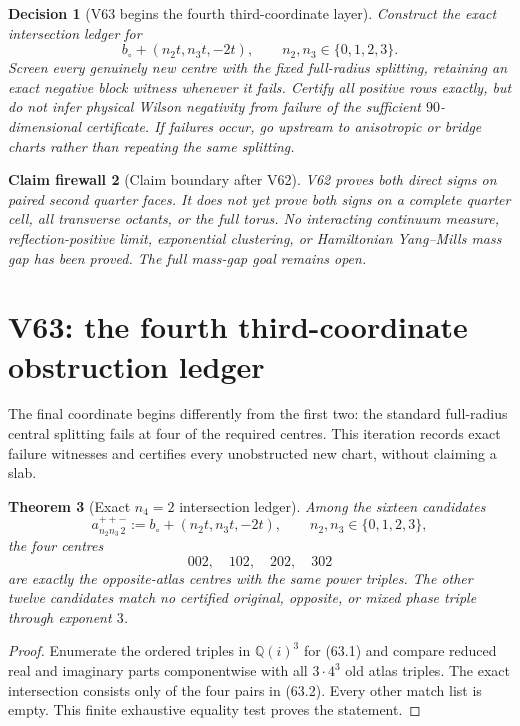 \documentclass[11pt,oneside]{article}
\newtheorem{theorem}{Theorem}[section]
\newtheorem{firewall}[theorem]{Claim firewall}
\newtheorem{decision}[theorem]{Decision}
\theoremstyle{definition}
\theoremstyle{remark}
\begin{document}
\begin{decision}[V63 begins the fourth third-coordinate layer]
\label{dec:newv62-next}
Construct the exact intersection ledger for
\[
 b_\circ+(n_2t,n_3t,-2t),\qquad n_2,n_3\in\{0,1,2,3\}. \tag{62.14}
\]
Screen every genuinely new centre with the fixed full-radius
splitting, retaining an exact negative block witness whenever it
fails.  Certify all positive rows exactly, but do not infer physical
Wilson negativity from failure of the sufficient \(90\)-dimensional
certificate.  If failures occur, go upstream to anisotropic or
bridge charts rather than repeating the same splitting.
\end{decision}

\begin{firewall}[Claim boundary after V62]
\label{fire:newv62-final}
V62 proves both direct signs on paired second quarter faces.  It
does not yet prove both signs on a complete quarter cell, all
transverse octants, or the full torus.  No interacting continuum
measure, reflection-positive limit, exponential clustering, or
Hamiltonian Yang--Mills mass gap has been proved.  The full
mass-gap goal remains open.
\end{firewall}

\section{V63: the fourth third-coordinate obstruction ledger}
\label{sec:newv63-fourth-third-obstruction}

The final coordinate begins differently from the first two: the
standard full-radius central splitting fails at four of the required
centres.  This iteration records exact failure witnesses and
certifies every unobstructed new chart, without claiming a slab.

\begin{theorem}[Exact \(n_4=2\) intersection ledger]
\label{thm:newv63-intersections}
Among the sixteen candidates
\[
 a_{n_2n_3\,2}^{++-}
 :=b_\circ+(n_2t,n_3t,-2t),
 \qquad n_2,n_3\in\{0,1,2,3\},                        \tag{63.1}
\]
the four centres
\[
 002,\quad102,\quad202,\quad302                      \tag{63.2}
\]
are exactly the opposite-atlas centres with the same power triples.
The other twelve candidates match no certified original, opposite,
or mixed phase triple through exponent \(3\).
\end{theorem}

\begin{proof}
Enumerate the ordered triples in \(\mathbb Q(i)^3\) for (63.1) and
compare reduced real and imaginary parts componentwise with all
\(3\cdot4^3\) old atlas triples.  The exact intersection consists
only of the four pairs in (63.2).  Every other match list is empty.
This finite exhaustive equality test proves the statement.
\end{proof}
\end{document}
